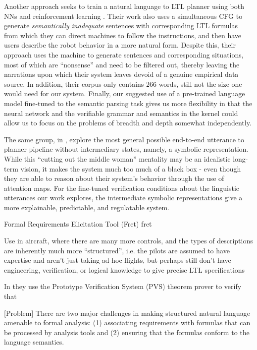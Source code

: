 \documentclass[a4paper, 11pt]{article}
\begin{document}
Another approach seeks to train a natural language to LTL planner using both NNs
and reinforcement learning \cite{ltlSemParse}. Their work also uses a
simultaneous CFG to generate \emph{semantically inadequate} sentences with
corresponding LTL formulas from which they can direct machines to follow the
instructions, and then have users describe the robot behavior in a more natural
form. Despite this, their approach uses the machine to generate sentences and
corresponding situations, most of which are ``nonsense'' and need to be filtered
out, thereby leaving the narrations upon which their system leaves devoid of a
genuine empirical data source. In addition, their corpus only contains 266
words, still not the size one would need for our system. Finally, our suggested
use of a pre-trained language model fine-tuned to the semantic parsing task
gives us more flexibility in that the neural network and the verifiable grammar
and semantics in the kernel could allow us to focus on the problems of breadth
and depth somewhat independently.

The same group, in \cite{kuo2020deep}, explore the most general possible
end-to-end utterance to planner pipeline without intermediary states, namely, a
symbolic representation. While this ``cutting out the middle woman'' mentality
may be an idealistic long-term vision, it makes the system much too much of a
black box - even though they are able to reason about their system's behavior
through the use of attention maps. For the fine-tuned verification conditions
about the linguistic utterances our work explores, the intermediate symbolic
representations give a more explainable, predictable, and regulatable system.


Formal Requirements Elicitation Tool (Fret) {fret}

Use in aircraft, where there are many more controls, and the types of
descriptions are inherently much more ``structured'', i.e. the pilots are
assumed to have expertise and aren't just taking ad-hoc flights, but perhaps
still don't have engineering, verification, or logical knowledge to give precise
LTL specifications

In \cite{fret} they use the Prototype Verification System (PVS) theorem prover
to verify that 

[Problem] There are two major challenges in making structured natural language
amenable to formal analysis: (1) associating requirements with formulas that can
be processed by analysis tools and (2) ensuring that the formulas conform to the
language semantics. \cite{fretish}
\end{document}
